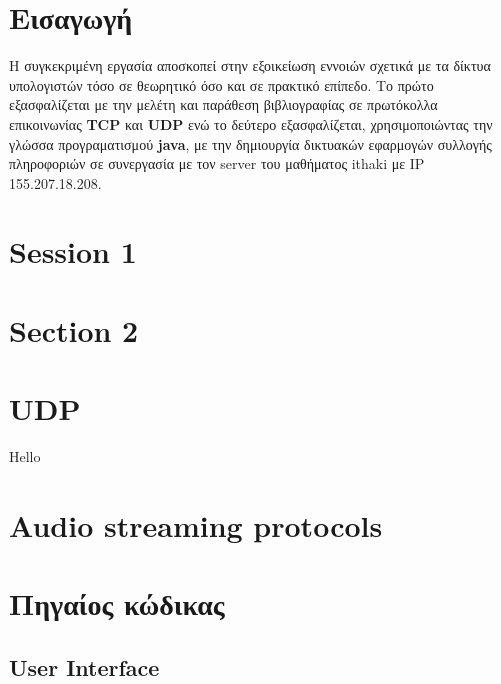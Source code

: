 \documentclass[hidelinks, 12pt, a4paper]{article}
\begin{document}



\pagebreak
\tableofcontents
\pagebreak



\section{Εισαγωγή}

Η συγκεκριμένη εργασία αποσκοπεί στην εξοικείωση εννοιών σχετικά με τα δίκτυα υπολογιστών τόσο σε θεωρητικό όσο και σε πρακτικό επίπεδο. Το πρώτο εξασφαλίζεται με την μελέτη και παράθεση βιβλιογραφίας σε πρωτόκολλα επικοινωνίας \textbf{TCP} και \textbf{UDP} ενώ το δεύτερο εξασφαλίζεται, χρησιμοποιώντας την γλώσσα προγραματισμού \textbf{java}, με την δημιουργία δικτυακών εφαρμογών συλλογής πληροφοριών σε συνεργασία με τον server του μαθήματος ithaki με IP 155.207.18.208.

\section{Session 1}

\section{Section 2}

\section{UDP}
Hello

\section{Audio streaming protocols}

\section{Πηγαίος κώδικας}

\subsection{User Interface}
\end{document}

